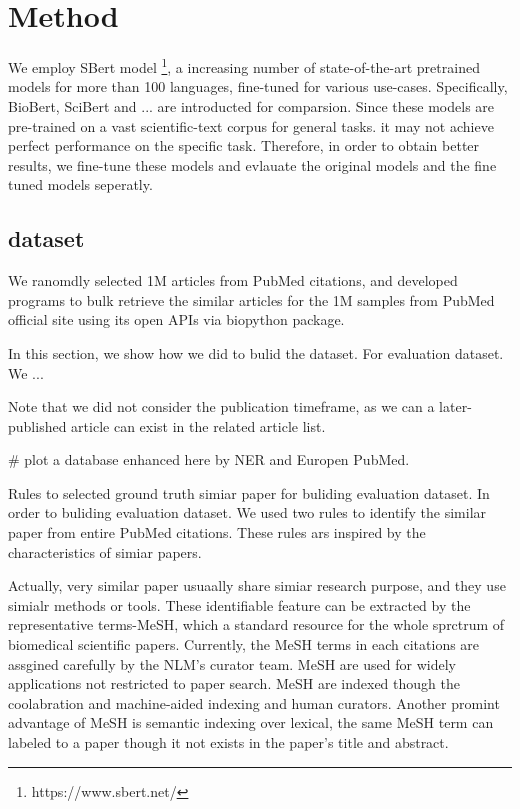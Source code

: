 \documentclass[11pt]{article}
\begin{document}
    \section{Method}
    We employ SBert model \footnote{https://www.sbert.net/}, a increasing number of state-of-the-art pretrained models for more than 100 languages, fine-tuned for various use-cases.
    Specifically, BioBert, SciBert and ... are introducted  for comparsion. Since these models are pre-trained on a vast scientific-text corpus for general tasks. it may not achieve perfect performance on the specific task. Therefore,
    in order to obtain better results, we fine-tune these models and evlauate the original models and the fine tuned models seperatly.



    \subsection{dataset}
    We ranomdly selected 1M articles from PubMed citations, and developed programs to bulk retrieve the similar articles for the 1M samples from PubMed official site using its open APIs via biopython \cite{10.1093/bioinformatics/btp163} package.

    In this section, we show how we did to bulid the dataset. For evaluation dataset. We ...

    Note that we did not consider the publication timeframe, as we can a later-published article can exist in the related article list.

    # plot a database enhanced here by NER and Europen PubMed.

    Rules to selected ground truth simiar paper for buliding evaluation dataset.
    In order to buliding evaluation dataset. We used two rules to identify the similar paper from entire PubMed citations. These rules ars inspired by the characteristics of simiar papers.

    Actually, very similar paper usuaally share simiar research purpose, and they use simialr methods or tools. These identifiable feature can be extracted by the representative terms-MeSH, which a standard resource for the whole sprctrum of biomedical scientific papers.
    Currently, the MeSH terms in each citations are assgined carefully by the NLM's curator team. MeSH are used for widely applications not restricted to paper search. MeSH are indexed though the coolabration and machine-aided indexing and human curators.
    Another promint advantage of MeSH is semantic indexing over lexical, the same MeSH term can labeled to a paper though it not exists in the paper's title and abstract.
\end{document}
